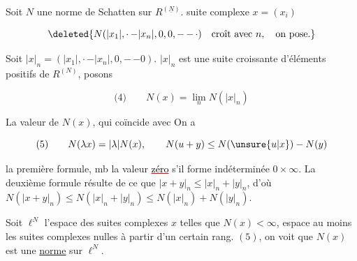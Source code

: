 Soit $N$  une norme de Schatten sur  $R^{(\underline N)}$.  suite  complexe $x=(x_i)$   

\[
\deleted{N(|x_1|,\mathord{\cdot}\,\mathord{-}|x_n|,0,0,\mathord{-}\,\mathord{-}\,\mathord{\cdot})\quad\text{croît avec }n,\quad\text{on pose.}}
\]

Soit $|x|_n=(|x_1|,\mathord{\cdot}\,\mathord{-}|x_n|,0,\mathord{-}\,\mathord{-}0)$.   $|x|_n$ est une suite croissante d'éléments positifs de $R^{(N)}$, posons

\[
\text{(4)}\qquad N(x)=\lim_n N(|x|_n)
\]

 La valeur  de $N(x)$, qui coïncide avec   On a

\[
\text{(5)}\qquad N(\lambda x)=|\lambda|N(x),\qquad N(u+y)\leq N(\unsure{u|x})-N(y)
\]

  la première formule,  
\reversemarginpar
\margin{\textcolor{red}{?}}
\normalmarginpar
mb la valeur \textcolor{red}{\uline{\textcolor{black}{zéro}}} s'il  forme indéterminée $0\times\infty$. La deuxième formule résulte de ce que  $|x+y|_n\leq |x|_n+|y|_n$, d'où $N(|x+y|_n)\leq N(|x|_n+|y|_n)\leq N(|x|_n)+N(|y|_n)$.

 Soit $\ell^N$ l'espace des suites complexes $x$ telles que $N(x)<\infty$, espace  au moins  les suites complexes nulles à partir  d'un certain rang.  $(5)$, on voit que $N(x)$ est une \uline{norme} sur $\ell^N$.


